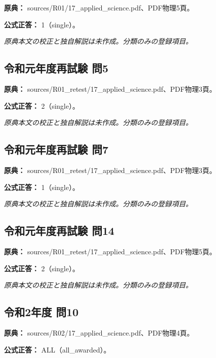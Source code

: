 \noindent\textbf{原典：} sources/R01/17\_applied\_science.pdf、PDF物理5頁。

\textbf{公式正答：} 1（single）。

\par\textit{原典本文の校正と独自解説は未作成。分類のみの登録項目。}

\subsection{令和元年度再試験 問5}
\label{q:r01-ret-applied-05}

\noindent\textbf{原典：} sources/R01\_retest/17\_applied\_science.pdf、PDF物理3頁。

\textbf{公式正答：} 2（single）。

\par\textit{原典本文の校正と独自解説は未作成。分類のみの登録項目。}

\subsection{令和元年度再試験 問7}
\label{q:r01-ret-applied-07}

\noindent\textbf{原典：} sources/R01\_retest/17\_applied\_science.pdf、PDF物理3頁。

\textbf{公式正答：} 1（single）。

\par\textit{原典本文の校正と独自解説は未作成。分類のみの登録項目。}

\subsection{令和元年度再試験 問14}
\label{q:r01-ret-applied-14}

\noindent\textbf{原典：} sources/R01\_retest/17\_applied\_science.pdf、PDF物理5頁。

\textbf{公式正答：} 2（single）。

\par\textit{原典本文の校正と独自解説は未作成。分類のみの登録項目。}

\subsection{令和2年度 問10}
\label{q:r02-reg-applied-10}

\noindent\textbf{原典：} sources/R02/17\_applied\_science.pdf、PDF物理4頁。

\textbf{公式正答：} ALL（all\_awarded）。

